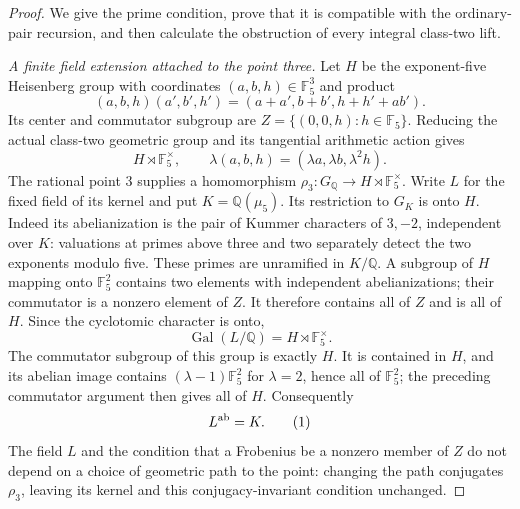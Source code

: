 \begin{proof}
We give the prime condition, prove that it is compatible
with the ordinary-pair recursion, and then calculate the
obstruction of every integral class-two lift.

\emph{A finite field extension attached to the point three.}
Let \(H\) be the exponent-five Heisenberg group with
coordinates \((a,b,h)\in\mathbb F_5^3\) and product
\[
 (a,b,h)(a',b',h')=(a+a',b+b',h+h'+ab').
\]
Its center and commutator subgroup are
\(Z=\{(0,0,h):h\in\mathbb F_5\}\).
Reducing the actual class-two geometric group and its
tangential arithmetic action gives
\[
 H\rtimes\mathbb F_5^\times,
 \qquad \lambda(a,b,h)=(\lambda a,\lambda b,\lambda^2h).
\]
The rational point \(3\) supplies a homomorphism
\(\rho_3:G_{\mathbb Q}\to H\rtimes\mathbb F_5^\times\).
Write \(L\) for the fixed field of its kernel and put
\(K=\mathbb Q(\mu_5)\). Its restriction to \(G_K\)
is onto \(H\). Indeed its abelianization is the pair
of Kummer characters of \(3,-2\), independent over
\(K\): valuations at primes above three and two
separately detect the two exponents modulo five.
These primes are unramified in \(K/\mathbb Q\).
A subgroup of \(H\) mapping onto \(\mathbb F_5^2\)
contains two elements with independent abelianizations;
their commutator is a nonzero element of \(Z\).
It therefore contains all of \(Z\) and is all of \(H\).
Since the cyclotomic character is onto,
\[
 \operatorname{Gal}(L/\mathbb Q)=H\rtimes\mathbb F_5^\times.
\]
The commutator subgroup of this group is exactly \(H\).
It is contained in \(H\), and its abelian image contains
\((\lambda-1)\mathbb F_5^2\) for \(\lambda=2\),
hence all of \(\mathbb F_5^2\); the preceding commutator
argument then gives all of \(H\). Consequently
\[
                  L^{\rm ab}=K.                 \tag{1}
\]
The field \(L\) and the condition that a Frobenius be
a nonzero member of \(Z\) do not depend on a choice
of geometric path to the point: changing the path
conjugates \(\rho_3\), leaving its kernel and this
conjugacy-invariant condition unchanged.


\end{proof}
